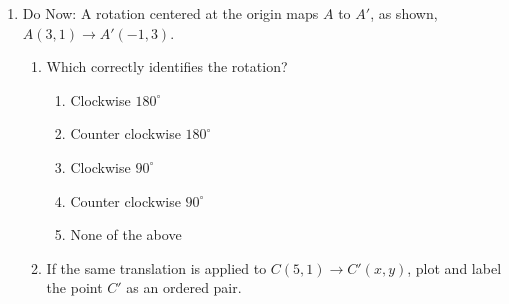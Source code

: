 \documentclass[12pt, twoside]{article}
\begin{document}
\begin{enumerate}
\newpage
\item Do Now: A rotation centered at the origin maps $A$ to $A'$, as shown, $A(3,1) \rightarrow A'(-1,3)$.
\begin{multicols}{2}
  \begin{enumerate}
    \item Which correctly identifies the rotation?
    \begin{enumerate}[label=(\Alph*)]
      \item Clockwise $180^\circ$
      \item Counter clockwise $180^\circ$
      \item Clockwise $90^\circ$
      \item Counter clockwise $90^\circ$
      \item None of the above
    \end{enumerate} \vspace{2cm}
    \item If the same translation is applied to $C(5,1)\rightarrow C'(x,y)$, plot and label the point $C'$ as an ordered pair.
    \end{enumerate}
    \begin{flushright}
    \end{flushright}
\end{multicols}


\end{enumerate}
\end{document}
